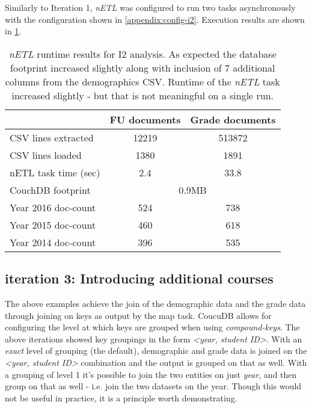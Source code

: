Similarly to Iteration 1, \textit{nETL} was configured to run two tasks asynchronously with the configuration shown in \ref{appendix:config-i2}. Execution results are shown in \ref{i2-results}.

\begin{table}[]
    \centering
    \caption{\textit{nETL} runtime results for I2 analysis. As expected the database footprint increased slightly along with inclusion of 7 additional columns from the demographics CSV. Runtime of the \textit{nETL} task increased slightly - but that is not meaningful on a single run.}
    \label{i2-results}
    \begin{tabular}{lcc}
                             & FU documents              & Grade documents \\ \hline
        CSV lines extracted  & 12219                     & 513872          \\
        CSV lines loaded     & 1380                      & 1891            \\
        nETL task time (sec) & 2.4                       & 33.8            \\
        CouchDB footprint    & \multicolumn{2}{c}{0.9MB}                   \\
        Year 2016 doc-count  & 524                       & 738             \\
        Year 2015 doc-count  & 460                       & 618             \\
        Year 2014 doc-count  & 396                       & 535             \\
    \end{tabular}
\end{table}


\subsection{iteration 3: Introducing additional courses}
The above examples achieve the join of the demographic data and the grade data through joining on keys as output by the map task. CoucuDB allows for configuring the level at which keys are grouped when using \textit{compound-keys}. The above iterations showed key groupings in the form \textit{<year, student ID>}. With an \textit{exact} level of grouping (the default), demographic and grade data is joined on the \textit{<year, student ID>} combination and the output is grouped on that as well. With a grouping of level 1 it's possible to join the two entities on just \textit{year}, and then group on that as well - i.e. join the two datasets on the year. Though this would not be useful in practice, it is a principle worth demonstrating.

